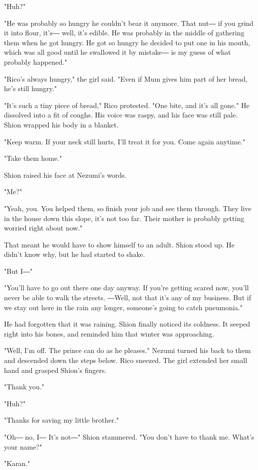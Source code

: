 "Huh?"

"He was probably so hungry he couldn't bear it anymore. That nut― if you
grind it into flour, it's― well, it's edible. He was probably in the
middle of gathering them when he got hungry. He got so hungry he decided
to put one in his mouth, which was all good until he swallowed it by
mistake― is my guess of what probably happened."

"Rico's always hungry," the girl said. "Even if Mum gives him part of
her bread, he's still hungry."

"It's such a tiny piece of bread," Rico protested. "One bite, and it's
all gone." He dissolved into a fit of coughs. His voice was raspy, and
his face was still pale. Shion wrapped his body in a blanket.

"Keep warm. If your neck still hurts, I'll treat it for you. Come again
anytime."

"Take them home."

Shion raised his face at Nezumi's words.

"Me?"

"Yeah, you. You helped them, so finish your job and see them through.
They live in the house down this slope, it's not too far. Their mother
is probably getting worried right about now."

That meant he would have to show himself to an adult. Shion stood up. He
didn't know why, but he had started to shake.

"But I―"

"You'll have to go out there one day anyway. If you're getting scared
now, you'll never be able to walk the streets. ―Well, not that it's any
of my business. But if we stay out here in the rain any longer,
someone's going to catch pneumonia."

He had forgotten that it was raining. Shion finally noticed its
coldness. It seeped right into his bones, and reminded him that winter
was approaching.

"Well, I'm off. The prince can do as he pleases." Nezumi turned his back
to them and descended down the steps below. Rico sneezed. The girl
extended her small hand and grasped Shion's fingers.

"Thank you."

"Huh?"

"Thanks for saving my little brother."

"Oh― no, I― It's not―" Shion stammered. "You don't have to thank me.
What's your name?"

"Karan."

